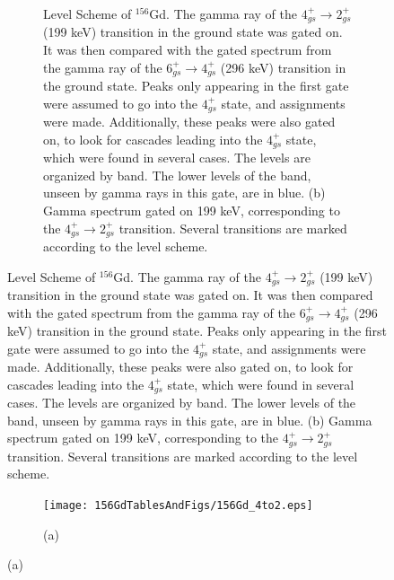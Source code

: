 \begin{landscape}
\begin{figure}[!]
    \centering
    \label{fig:156_4to2}
    \begin{subfigure}{1.4\textwidth}
    \caption{\centering \fontsize{10pt}{12pt}Level Scheme of $^{156}$Gd. The gamma ray of the $4^+_{gs}\rightarrow 2^+_{gs}$ (199 keV) transition in the ground state was gated on. It was then compared with the gated spectrum from the gamma ray of the $6^+_{gs}\rightarrow 4^+_{gs}$ (296 keV) transition in the ground state. Peaks only appearing in the first gate were assumed to go into the $4^+_{gs}$ state, and assignments were made. Additionally, these peaks were also gated on, to look for cascades leading into the $4^+_{gs}$ state, which were found in several cases. The levels are organized by band. The lower levels of the band, unseen by gamma rays in this gate, are in blue. (b) Gamma spectrum gated on 199 keV, corresponding to the $4^+_{gs}\rightarrow 2^+_{gs}$ transition. Several transitions are marked according to the level scheme.}
    \end{subfigure}
\end{figure}
\clearpage
\begin{figure}
    \ContinuedFloat
    \begin{subfigure}{1.4\textwidth}
    \texttt{[image: 156GdTablesAndFigs/156Gd\_4to2.eps]}
    \caption*{(a)}
    \label{fig:156_4to2level}
    \end{subfigure}
    \end{figure}
\end{landscape}
